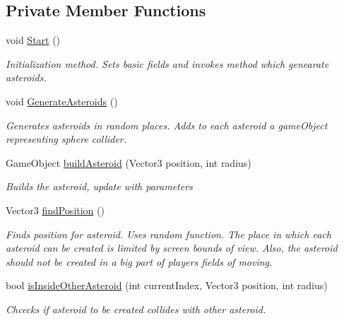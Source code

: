 \subsection*{Private Member Functions}
\begin{DoxyCompactItemize}
\item 
void \mbox{\hyperlink{class_asteroid_generator_a5d75cc116d119536c96fa54922d97708}{Start}} ()
\begin{DoxyCompactList}\small\item\em Initialization method. Sets basic fields and invokes method which genearate asteroids. \end{DoxyCompactList}\item 
void \mbox{\hyperlink{class_asteroid_generator_ac7589dbfe747647e96258ae54a881d82}{Generate\+Asteroids}} ()
\begin{DoxyCompactList}\small\item\em Generates asteroids in random places. Adds to each asteroid a game\+Object representing sphere collider. \end{DoxyCompactList}\item 
Game\+Object \mbox{\hyperlink{class_asteroid_generator_a8ee9800524293ee0974caeb3f0077cf5}{build\+Asteroid}} (Vector3 position, int radius)
\begin{DoxyCompactList}\small\item\em Builds the asteroid, update with parameters \end{DoxyCompactList}\item 
Vector3 \mbox{\hyperlink{class_asteroid_generator_ae494004ca219dbbe8333f2e3e5cc7887}{find\+Position}} ()
\begin{DoxyCompactList}\small\item\em Finds position for asteroid. Uses random function. The place in which each asteroid can be created is limited by screen bounds of view. Also, the asteroid should not be created in a big part of players\textquotesingle{} fields of moving. \end{DoxyCompactList}\item 
bool \mbox{\hyperlink{class_asteroid_generator_a70d6b7053f69bbbdc20aa10bfe77f6bb}{is\+Inside\+Other\+Asteroid}} (int current\+Index, Vector3 position, int radius)
\begin{DoxyCompactList}\small\item\em Chcecks if asteroid to be created collides with other asteroid. \end{DoxyCompactList}\end{DoxyCompactItemize}
